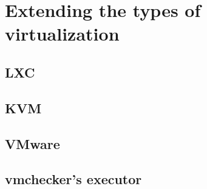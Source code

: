 \chapter{Extending the types of virtualization}
\label{chapter:virt-types}


\section{LXC}
\label{sec:vmc-lxc}

\section{KVM}
\label{sec:vmc-kvm}

\section{VMware}
\label{sec:vmc-vmware}

\section{vmchecker's executor}
\label{sec:vmc-executor}



